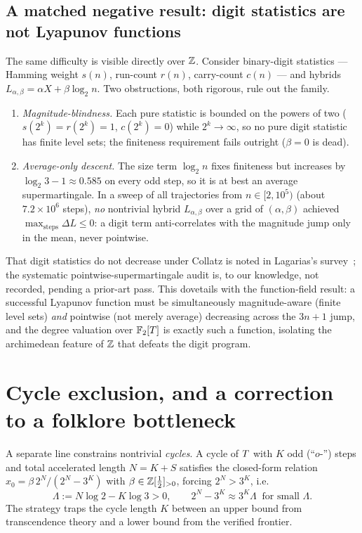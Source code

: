 \documentclass[11pt]{amsart}
\theoremstyle{definition}
\theoremstyle{remark}
\begin{document}
\subsection{A matched negative result: digit statistics are not Lyapunov functions}
The same difficulty is visible directly over $\mathbb{Z}$. Consider binary-digit statistics --- Hamming
weight $s(n)$, run-count $r(n)$, carry-count $c(n)$ --- and hybrids $L_{\alpha,\beta}=\alpha X+\beta\log_2 n$.
Two obstructions, both rigorous, rule out the family.
\begin{enumerate}[label=(O\arabic*)]
\item \emph{Magnitude-blindness.} Each pure statistic is bounded on the powers of two
($s(2^k)=r(2^k)=1$, $c(2^k)=0$) while $2^k\to\infty$, so no pure digit statistic has finite level
sets; the finiteness requirement fails outright ($\beta=0$ is dead).
\item \emph{Average-only descent.} The size term $\log_2 n$ fixes finiteness but increases by
$\log_2 3-1\approx0.585$ on every odd step, so it is at best an average supermartingale. In a sweep of
all trajectories from $n\in[2,10^5)$ (about $7.2\times10^6$ steps), \emph{no} nontrivial hybrid
$L_{\alpha,\beta}$ over a grid of $(\alpha,\beta)$ achieved $\max_{\text{steps}}\Delta L\le0$: a digit
term anti-correlates with the magnitude jump only in the mean, never pointwise.
\end{enumerate}
That digit statistics do not decrease under Collatz is noted in Lagarias's survey~\citep{lagarias1985};
the systematic pointwise-supermartingale audit is, to our knowledge, not recorded, pending a prior-art
pass. This dovetails with the function-field result: a successful Lyapunov function must be
simultaneously magnitude-aware (finite level sets) \emph{and} pointwise (not merely average)
decreasing across the $3n+1$ jump, and the degree valuation over $\mathbb{F}_2[T]$ is exactly such a
function, isolating the archimedean feature of $\mathbb{Z}$ that defeats the digit program.

\section{Cycle exclusion, and a correction to a folklore bottleneck}
\label{sec:cycles}

A separate line constrains nontrivial \emph{cycles}. A cycle of $T$ with $K$ odd (``$o$-'') steps and
total accelerated length $N=K+S$ satisfies the closed-form relation $x_0=\beta\,2^N/(2^N-3^K)$ with
$\beta\in\mathbb{Z}[\tfrac12]_{>0}$, forcing $2^N>3^K$, i.e.
\begin{equation}
   \Lambda := N\log 2 - K\log 3 > 0,\qquad 2^N-3^K\approx 3^K\Lambda\ \text{ for small }\Lambda.
   \label{eq:lambda}
\end{equation}
The strategy traps the cycle length $K$ between an upper bound from transcendence theory and a lower bound
from the verified frontier.
\end{document}
